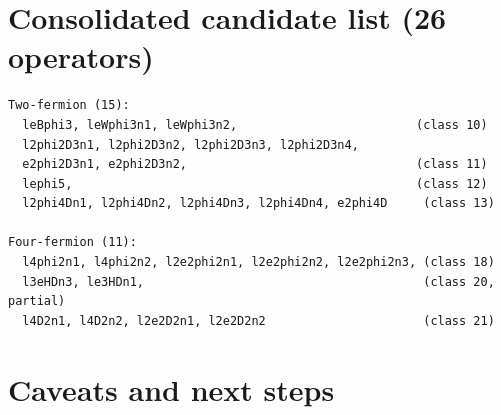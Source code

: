 \documentclass[11pt,a4paper]{article}
\begin{document}
\section{Consolidated candidate list (26 operators)}

\begin{verbatim}
Two-fermion (15):
  leBphi3, leWphi3n1, leWphi3n2,                         (class 10)
  l2phi2D3n1, l2phi2D3n2, l2phi2D3n3, l2phi2D3n4,
  e2phi2D3n1, e2phi2D3n2,                                (class 11)
  lephi5,                                                (class 12)
  l2phi4Dn1, l2phi4Dn2, l2phi4Dn3, l2phi4Dn4, e2phi4D     (class 13)

Four-fermion (11):
  l4phi2n1, l4phi2n2, l2e2phi2n1, l2e2phi2n2, l2e2phi2n3, (class 18)
  l3eHDn3, le3HDn1,                                       (class 20, partial)
  l4D2n1, l4D2n2, l2e2D2n1, l2e2D2n2                      (class 21)
\end{verbatim}

\section{Caveats and next steps}
\end{document}
